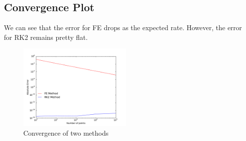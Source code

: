 \documentclass[11pt,letterpaper]{article}
\begin{document}
\newpage
\subsection{Convergence Plot}
We can see that the error for FE drops as the expected rate. However, the error for RK2 remains pretty flat.

\begin{figure}[h!]
	\centering
	\includegraphics[width=0.5\textwidth]{ConvergePlot}
	\caption{Convergence of two methods}
	\label{fig:ConvergePlot}
\end{figure}
	
\end{document}

